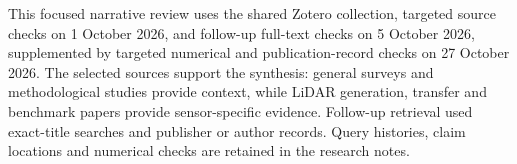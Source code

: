 This focused narrative review uses the shared Zotero collection, targeted
source checks on 1 October 2026, and follow-up full-text checks on
5 October 2026, supplemented by targeted numerical and publication-record
checks on 27 October 2026. The selected sources support the synthesis: general surveys and
methodological studies provide context, while LiDAR generation, transfer
and benchmark papers provide sensor-specific evidence. Follow-up retrieval
used exact-title searches and publisher or author records. Query histories,
claim locations and numerical checks are retained in the research notes.
